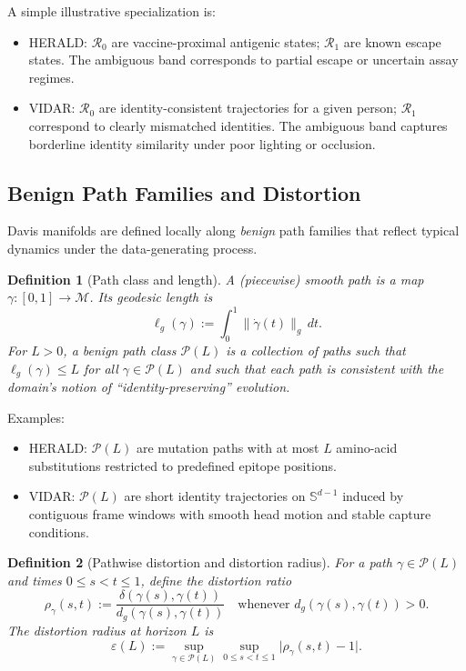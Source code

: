 \documentclass[11pt]{article}
\newtheorem{definition}{Definition}
\theoremstyle{remark}
\theoremstyle{plain}
\begin{document}
A simple illustrative specialization is:
\begin{itemize}
    \item HERALD: $\mathcal{R}_0$ are vaccine-proximal antigenic states; $\mathcal{R}_1$ are
    known escape states. The ambiguous band corresponds to partial escape or uncertain assay
    regimes.
    \item VIDAR: $\mathcal{R}_0$ are identity-consistent trajectories for a given person;
    $\mathcal{R}_1$ correspond to clearly mismatched identities. The ambiguous band captures
    borderline identity similarity under poor lighting or occlusion.
\end{itemize}

\subsection{Benign Path Families and Distortion}
\label{subsec:paths}

Davis manifolds are defined locally along \emph{benign} path families that reflect typical
dynamics under the data-generating process.

\begin{definition}[Path class and length]\label{def:path-family}
A (piecewise) smooth path is a map $\gamma:[0,1] \to \mathcal{M}$. Its geodesic length is
\[
    \ell_g(\gamma) := \int_0^1 \|\dot{\gamma}(t)\|_{g}\, dt.
\]
For $L>0$, a benign path class $\mathcal{P}(L)$ is a collection of paths such that
$\ell_g(\gamma) \le L$ for all $\gamma \in \mathcal{P}(L)$ and such that each path is
consistent with the domain's notion of ``identity-preserving'' evolution.
\end{definition}

Examples:
\begin{itemize}
    \item HERALD: $\mathcal{P}(L)$ are mutation paths with at most $L$ amino-acid
    substitutions restricted to predefined epitope positions.
    \item VIDAR: $\mathcal{P}(L)$ are short identity trajectories on $\mathbb{S}^{d-1}$
    induced by contiguous frame windows with smooth head motion and stable capture conditions.
\end{itemize}

\begin{definition}[Pathwise distortion and distortion radius]
For a path $\gamma\in\mathcal{P}(L)$ and times $0\le s<t\le 1$, define the distortion ratio
\[
    \rho_{\gamma}(s,t)
    :=
    \frac{\delta(\gamma(s),\gamma(t))}{d_g(\gamma(s),\gamma(t))}
    \quad\text{whenever } d_g(\gamma(s),\gamma(t))>0.
\]
The \emph{distortion radius} at horizon $L$ is
\[
    \varepsilon(L)
    :=
    \sup_{\gamma\in\mathcal{P}(L)}
    \sup_{0\le s<t\le 1}
    \bigl|\rho_{\gamma}(s,t) - 1\bigr|.
\]
\end{definition}
\end{document}
